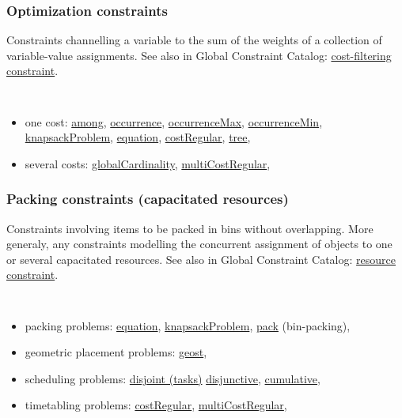 \subsubsection{Optimization constraints}\label{model:optimizationconstraints}\hypertarget{model:optimizationconstraints}{}
Constraints channelling a variable to the sum of the weights of a collection of variable-value assignments.
See also in Global Constraint Catalog: \href{http://www.emn.fr/x-info/sdemasse/gccat/Kcost_filtering_constraint.html}{cost-filtering constraint}.
\vspace{1em}\noindent\begin{notedef}\tt
 \begin{itemize}
  \item one cost: 
\hyperlink{among:amongconstraint}{among},
\hyperlink{occurrence:occurrenceconstraint}{occurrence},
\hyperlink{occurrencemax:occurrencemaxconstraint}{occurrenceMax},
\hyperlink{occurrencemin:occurrenceminconstraint}{occurrenceMin},
\hyperlink{knapsackproblem:knapsackproblemconstraint}{knapsackProblem},
\hyperlink{equation:equationconstraint}{equation},
\hyperlink{costregular:costregularconstraint}{costRegular},
\hyperlink{tree:treeconstraint}{tree},
 \item several costs:
\hyperlink{globalcardinality:globalcardinalityconstraint}{globalCardinality},
\hyperlink{multicostregular:multicostregularconstraint}{multiCostRegular}, 
 \end{itemize}
\end{notedef}

\subsubsection{Packing constraints (capacitated resources)}\label{model:packingconstraints}\hypertarget{model:packingconstraints}{}
Constraints involving items to be packed in bins without overlapping. More generaly, any constraints modelling the concurrent assignment of objects to one or several capacitated resources.
See also in Global Constraint Catalog: \href{http://www.emn.fr/x-info/sdemasse/gccat/Kresource_constraint.html}{resource constraint}.

\vspace{1em}\noindent\begin{notedef}\tt
   \begin{itemize}
   \item packing problems: 
\hyperlink{equation:equationconstraint}{equation},
\hyperlink{knapsackproblem:knapsackproblemconstraint}{knapsackProblem},
\hyperlink{pack:packconstraint}{pack} (bin-packing),
   \item geometric placement problems: 
\hyperlink{geost:geostconstraint}{geost}, 
   \item scheduling problems: 
\hyperlink{disjoint}{disjoint (tasks)} 
\hyperlink{disjunctive:disjunctiveconstraint}{disjunctive}, 
\hyperlink{cumulative:cumulativeconstraint}{cumulative}, 
   \item timetabling problems: 
\hyperlink{costregular:costregularconstraint}{costRegular},
\hyperlink{multicostregular:multicostregularconstraint}{multiCostRegular}, 
 \end{itemize}
\end{notedef}

